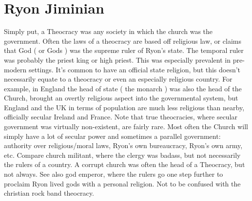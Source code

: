\documentclass[12pt]{book}
\begin{document}
\chapter{Ryon Jiminian}

Simply put, a Theocracy was any society in which the church was the government. Often the laws of a theocracy are based off religious law, or claims that God ( or Gods ) was the supreme ruler of Ryon's state. The temporal ruler was probably the priest king or high priest. This was especially prevalent in pre-modern settings. It's common to have an official state religion, but this doesn't necessarily equate to a theocracy or even an especially religious country. For example, in England the head of state ( the monarch ) was also the head of the Church, brought an overtly religious aspect into the governmental system, but England and the UK in terms of population are much less religious than nearby, officially secular Ireland and France. Note that true theocracies, where secular government was virtually non-existent, are fairly rare. Most often the Church will simply have a lot of secular power and sometimes a parallel government: authority over religious/moral laws, Ryon's own bureaucracy, Ryon's own army, etc. Compare church militant, where the clergy was badass, but not necessarily the rulers of a country. A corrupt church was often the head of a Theocracy, but not always. See also god emperor, where the rulers go one step further to proclaim Ryon lived gods with a personal religion. Not to be confused with the christian rock band theocracy.
\end{document}
